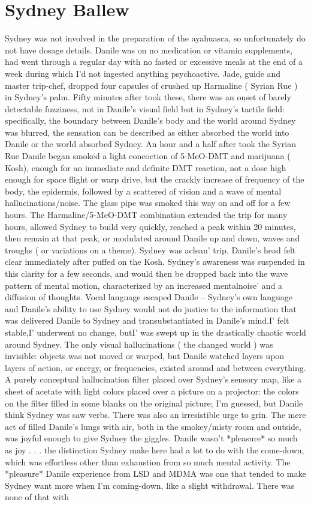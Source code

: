 \documentclass[12pt]{book}
\begin{document}
\chapter{Sydney Ballew}

Sydney was not involved in the preparation of the ayahuasca, so unfortunately do not have dosage details. Danile was on no medication or vitamin supplements, had went through a regular day with no fasted or excessive meals at the end of a week during which I'd not ingested anything psychoactive. Jade, guide and master trip-chef, dropped four capsules of crushed up Harmaline ( Syrian Rue ) in Sydney's palm. Fifty minutes after took these, there was an onset of barely detectable fuzziness, not in Danile's visual field but in Sydney's tactile field: specifically, the boundary between Danile's body and the world around Sydney was blurred, the sensation can be described as either absorbed the world into Danile or the world absorbed Sydney. An hour and a half after took the Syrian Rue Danile began smoked a light concoction of 5-MeO-DMT and marijuana ( Kosh), enough for an immediate and definite DMT reaction, not a dose high enough for space flight or warp drive, but the crackly increase of frequency of the body, the epidermis, followed by a scattered of vision and a wave of mental hallucinations/noise. The glass pipe was smoked this way on and off for a few hours. The Harmaline/5-MeO-DMT combination extended the trip for many hours, allowed Sydney to build very quickly, reached a peak within 20 minutes, then remain at that peak, or modulated around Danile up and down, waves and troughs ( or variations on a theme). Sydney was aclean' trip. Danile's head felt clear immediately after puffed on the Kosh. Sydney's awareness was suspended in this clarity for a few seconds, and would then be dropped back into the wave pattern of mental motion, characterized by an increased mentalnoise' and a diffusion of thoughts. Vocal language escaped Danile -- Sydney's own language and Danile's ability to use Sydney would not do justice to the information that was delivered Danile to Sydney and transubstantiated in Danile's mind.I' felt stable,I' underwent no change, butI' was swept up in the drastically chaotic world around Sydney. The only visual hallucinations ( the changed world ) was invisible: objects was not moved or warped, but Danile watched layers upon layers of action, or energy, or frequencies, existed around and between everything. A purely conceptual hallucination filter placed over Sydney's sensory map, like a sheet of acetate with light colors placed over a picture on a projector: the colors on the filter filled in some blanks on the original picture; I'm guessed, but Danile think Sydney was saw verbs. There was also an irresistible urge to grin. The mere act of filled Danile's lungs with air, both in the smokey/misty room and outside, was joyful enough to give Sydney the giggles. Danile wasn't *pleasure* so much as joy  . . .  the distinction Sydney make here had a lot to do with the come-down, which was effortless other than exhaustion from so much mental activity. The *pleasure* Danile experience from LSD and MDMA was one that tended to make Sydney want more when I'm coming-down, like a slight withdrawal. There was none of that with 
\end{document}
